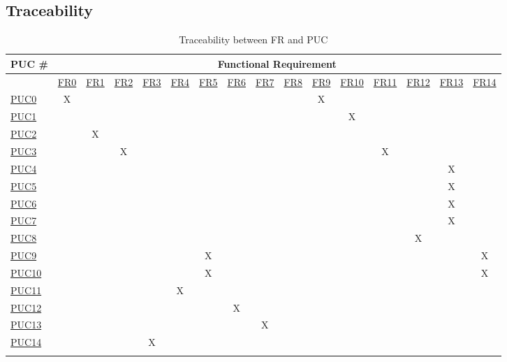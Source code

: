 \documentclass[12pt]{article}
\begin{document}
\newpage
\subsection{Traceability}
\setlength\LTleft{-2cm}
\scriptsize
\begin{longtable}{l|ccccccccccccccc}

PUC \# & \multicolumn{15}{c}{Functional Requirement} \\ \hline
\endfirsthead
%
\endhead
%
 & \hyperref[sec:FR0]{FR0} & \hyperref[sec:FR1]{FR1} & \hyperref[sec:FR2]{FR2} & \hyperref[sec:FR3]{FR3} & \hyperref[sec:FR4]{FR4} & \hyperref[sec:FR5]{FR5} & \hyperref[sec:FR6]{FR6} & \hyperref[sec:FR7]{FR7} & \hyperref[sec:FR8]{FR8} & \hyperref[sec:FR9]{FR9} & \hyperref[sec:FR10]{FR10} & \hyperref[sec:FR11]{FR11} & \hyperref[sec:FR12]{FR12} & \hyperref[sec:FR13]{FR13} & \hyperref[sec:FR14]{FR14} \\
\hyperref[sec:PUC0]{PUC0} & X &  &  &  &  &  &  &  &  & X &  &  &  &  &  \\
\hyperref[sec:PUC1]{PUC1} &  &  &  &  &  &  &  &  &  &  & X &  &  &  &  \\
\hyperref[sec:PUC2]{PUC2} &  & X &  &  &  &  &  &  &  &  &  &  &  &  &  \\
\hyperref[sec:PUC3]{PUC3} &  &  & X &  &  &  &  &  &  &  &  & X &  &  &  \\
\hyperref[sec:PUC4]{PUC4} &  &  &  &  &  &  &  &  &  &  &  &  &  & X &  \\
\hyperref[sec:PUC5]{PUC5} &  &  &  &  &  &  &  &  &  &  &  &  &  & X &  \\
\hyperref[sec:PUC6]{PUC6} &  &  &  &  &  &  &  &  &  &  &  &  &  & X &  \\
\hyperref[sec:PUC7]{PUC7} &  &  &  &  &  &  &  &  &  &  &  &  &  & X &  \\
\hyperref[sec:PUC8]{PUC8} &  &  &  &  &  &  &  &  &  &  &  &  & X &  &  \\
\hyperref[sec:PUC9]{PUC9} &  &  &  &  &  & X &  &  &  &  &  &  &  &  & X \\
\hyperref[sec:PUC10]{PUC10} &  &  &  &  &  & X &  &  &  &  &  &  &  &  & X \\
\hyperref[sec:PUC11]{PUC11} &  &  &  &  & X &  &  &  &  &  &  &  &  &  &  \\
\hyperref[sec:PUC12]{PUC12} &  &  &  &  &  &  & X &  &  &  &  &  &  &  &  \\
\hyperref[sec:PUC13]{PUC13} &  &  &  &  &  &  &  & X &  &  &  &  &  &  &  \\
\hyperref[sec:PUC14]{PUC14} &  &  &  & X &  &  &  &  &  &  &  &  &  &  & \\
\caption{Traceability between FR and PUC} \\
\end{longtable}
\end{document}
